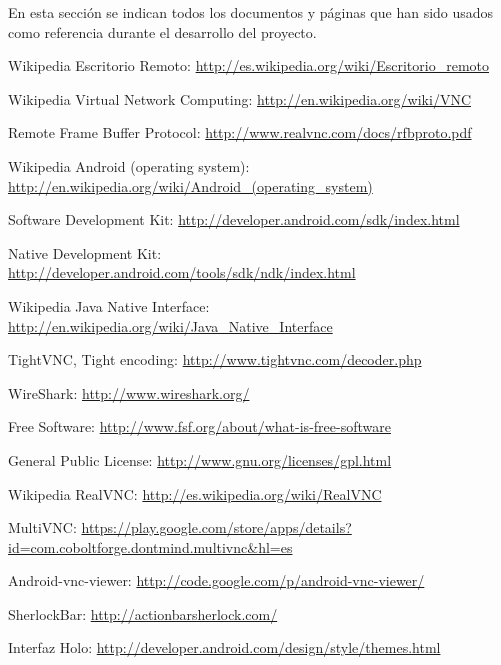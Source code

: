 En esta sección se indican todos los documentos y páginas que han sido usados como referencia durante el desarrollo del proyecto.

\begin{thebibliography}{11}

Wikipedia Escritorio Remoto: \url{http://es.wikipedia.org/wiki/Escritorio_remoto}

Wikipedia Virtual Network Computing: \url{http://en.wikipedia.org/wiki/VNC}

Remote Frame Buffer Protocol: \url{http://www.realvnc.com/docs/rfbproto.pdf}

Wikipedia Android (operating system): \url{http://en.wikipedia.org/wiki/Android_(operating_system)}

Software Development Kit:  \url{http://developer.android.com/sdk/index.html}

Native Development Kit: \url{http://developer.android.com/tools/sdk/ndk/index.html}

Wikipedia Java Native Interface: \url{http://en.wikipedia.org/wiki/Java_Native_Interface}

TightVNC, Tight encoding: \url{http://www.tightvnc.com/decoder.php}

WireShark: \url{http://www.wireshark.org/}

Free Software: \url{http://www.fsf.org/about/what-is-free-software}

General Public License: \url{http://www.gnu.org/licenses/gpl.html}

Wikipedia RealVNC: \url{http://es.wikipedia.org/wiki/RealVNC}

MultiVNC: \url{https://play.google.com/store/apps/details?id=com.coboltforge.dontmind.multivnc&hl=es}

Android-vnc-viewer: \url{http://code.google.com/p/android-vnc-viewer/}

SherlockBar: \url{http://actionbarsherlock.com/}

Interfaz Holo: \url{http://developer.android.com/design/style/themes.html}

\end{thebibliography} 
